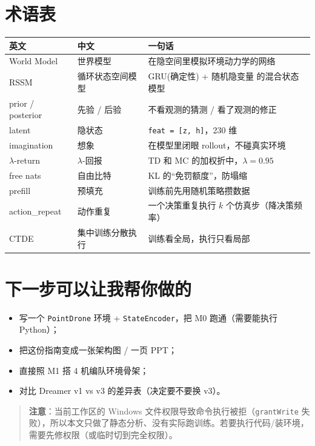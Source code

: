 \documentclass[11pt]{ctexart}
\begin{document}
\section{术语表}
\begin{tabularx}{\textwidth}{L L L}
\toprule
\textbf{英文} & \textbf{中文} & \textbf{一句话} \\
\midrule
World Model & 世界模型 & 在隐空间里模拟环境动力学的网络 \\
\addlinespace
RSSM & 循环状态空间模型 & GRU(确定性) + 随机隐变量 的混合状态模型 \\
\addlinespace
prior / posterior & 先验 / 后验 & 不看观测的猜测 / 看了观测的修正 \\
\addlinespace
latent & 隐状态 & \texttt{feat = [z, h]}，230 维 \\
\addlinespace
imagination & 想象 & 在模型里闭眼 rollout，不碰真实环境 \\
\addlinespace
$\lambda$-return & $\lambda$-回报 & TD 和 MC 的加权折中，$\lambda=0.95$ \\
\addlinespace
free nats & 自由比特 & KL 的``免罚额度''，防塌缩 \\
\addlinespace
prefill & 预填充 & 训练前先用随机策略攒数据 \\
\addlinespace
action\_repeat & 动作重复 & 一个决策重复执行 $k$ 个仿真步（降决策频率） \\
\addlinespace
CTDE & 集中训练分散执行 & 训练看全局，执行只看局部 \\
\bottomrule
\end{tabularx}

\section{下一步可以让我帮你做的}
\begin{itemize}
  \item 写一个 \texttt{PointDrone} 环境 + \texttt{StateEncoder}，把 M0 跑通（需要能执行 Python）；
  \item 把这份指南变成一张架构图 / 一页 PPT；
  \item 直接照 M1 搭 4 机编队环境骨架；
  \item 对比 Dreamer v1 vs v3 的差异表（决定要不要换 v3）。
\end{itemize}

\begin{quote}
\textbf{注意}：当前工作区的 Windows 文件权限导致命令执行被拒（\texttt{grantWrite} 失败），所以本文只做了静态分析、没有实际跑训练。若要执行代码/装环境，需要先修权限（或临时切到完全权限）。
\end{quote}
\end{document}
